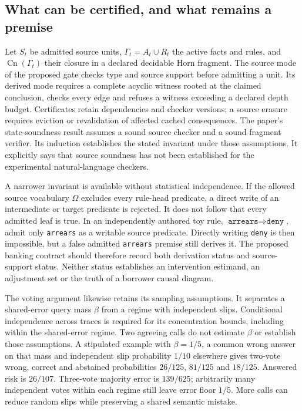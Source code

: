 \subsection{What can be certified, and what remains a premise}
\label{exec23:controlled-writes-model}
Let $S_t$ be admitted source units, $\Gamma_t=A_t\cup R_t$ the active
facts and rules, and $\operatorname{Cn}(\Gamma_t)$ their closure in a
declared decidable Horn fragment. The source mode of the proposed gate
checks type and source support before admitting a unit. Its derived mode
requires a complete acyclic witness rooted at the claimed conclusion,
checks every edge and refuses a witness exceeding a declared depth budget.
Certificates retain dependencies and checker versions; a source erasure
requires eviction or revalidation of affected cached consequences. The
paper's state-soundness result assumes a sound source checker and a sound
fragment verifier. Its induction establishes the stated invariant under
those assumptions. It explicitly says that source soundness has not been
established for the experimental natural-language checkers.
\citep{exec23_controlled_writes_paper}

A narrower invariant is available without statistical independence. If the
allowed source vocabulary $\Omega$ excludes every rule-head predicate,
a direct write of an intermediate or target predicate is rejected. It does
not follow that every admitted leaf is true. In an independently authored
toy rule, $\texttt{arrears}\Rightarrow\texttt{deny}$, admit only
\texttt{arrears} as a writable source predicate. Directly writing
\texttt{deny} is then impossible, but a false admitted \texttt{arrears}
premise still derives it. The proposed banking contract should therefore
record both derivation status and source-support status. Neither status
establishes an intervention estimand, an adjustment set or the truth of a
borrower causal diagram.
\citep{exec23_controlled_writes_paper,exec23_controlled_writes_reference}

The voting argument likewise retains its sampling assumptions. It separates
a shared-error query mass $\beta$ from a regime with independent slips.
Conditional independence across traces is required for its concentration
bounds, including within the shared-error regime. Two agreeing calls do
not estimate $\beta$ or establish those assumptions. A stipulated example
with $\beta=1/5$, a common wrong answer on that mass and independent slip
probability $1/10$ elsewhere gives two-vote wrong, correct and abstained
probabilities $26/125$, $81/125$ and $18/125$. Answered risk is $26/107$.
Three-vote majority error is $139/625$; arbitrarily many independent votes
within each regime still leave error floor $1/5$. More calls can reduce
random slips while preserving a shared semantic mistake.
\citep{exec23_controlled_writes_paper,exec23_controlled_writes_reference}

